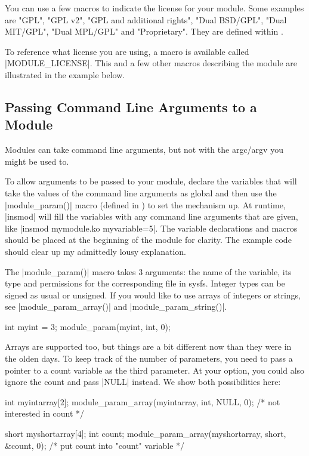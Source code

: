 \documentclass[10pt, oneside]{book}
\begin{document}
You can use a few macros to indicate the license for your module.
Some examples are "GPL", "GPL v2", "GPL and additional rights", "Dual BSD/GPL", "Dual MIT/GPL", "Dual MPL/GPL" and "Proprietary".
They are defined within .

To reference what license you are using, a macro is available called \cpp|MODULE_LICENSE|.
This and a few other macros describing the module are illustrated in the example below.


\subsection{Passing Command Line Arguments to a Module}
\label{sec:modparam}
Modules can take command line arguments, but not with the argc/argv you might be used to.

To allow arguments to be passed to your module, declare the variables that will take the values of the command line arguments as global and then use the \cpp|module_param()| macro (defined in ) to set the mechanism up.
At runtime, \sh|insmod| will fill the variables with any command line arguments that are given, like \sh|insmod mymodule.ko myvariable=5|.
The variable declarations and macros should be placed at the beginning of the module for clarity.
The example code should clear up my admittedly lousy explanation.

The \cpp|module_param()| macro takes 3 arguments: the name of the variable, its type and permissions for the corresponding file in sysfs.
Integer types can be signed as usual or unsigned. If you would like to use arrays of integers or strings,
see \cpp|module_param_array()| and \cpp|module_param_string()|.

\begin{code}
int myint = 3;
module_param(myint, int, 0);
\end{code}

Arrays are supported too, but things are a bit different now than they were in the olden days.
To keep track of the number of parameters, you need to pass a pointer to a count variable as the third parameter.
At your option, you could also ignore the count and pass \cpp|NULL| instead.
We show both possibilities here:

\begin{code}
int myintarray[2];
module_param_array(myintarray, int, NULL, 0); /* not interested in count */

short myshortarray[4];
int count;
module_param_array(myshortarray, short, &count, 0); /* put count into "count" variable */
\end{code}
\end{document}

